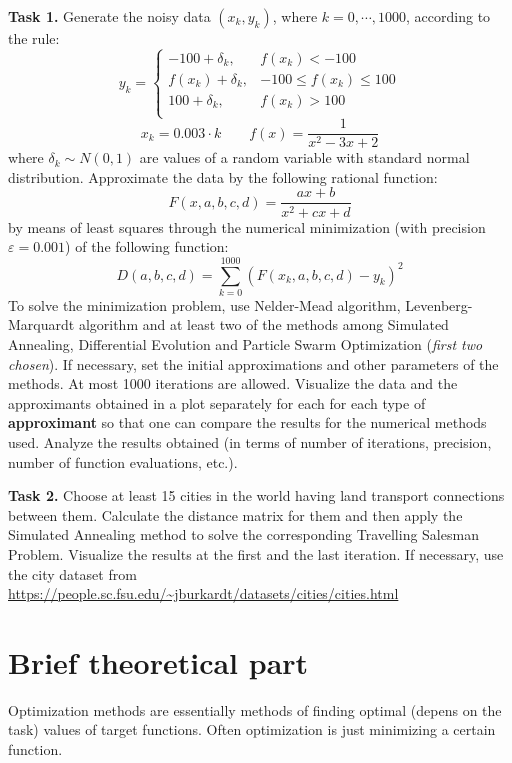 \documentclass[12pt, a4paper]{article}
\begin{document}
\textbf{Task 1.} Generate the noisy data $(x_k, y_k)$, where $k = 0, \cdots, 1000$, according to the rule:
\[ y_k = \begin{cases}
	-100 + \delta_k,   & f(x_k) < -100             \\
	f(x_k) + \delta_k, & -100 \leq f(x_k) \leq 100 \\
	100 + \delta_k,    & f(x_k) > 100              \\
\end{cases} \]
\[ x_k = 0.003 \cdot k \qquad f(x) = \frac{1}{x^2 - 3x + 2} \]
where $\delta_k \sim N(0, 1)$ are values of a random variable with standard normal distribution. Approximate the data by the following rational function:
\[ F(x, a, b, c, d) = \frac{ax + b}{x^2 + cx + d} \]
by means of least squares through the numerical minimization (with precision $\varepsilon = 0.001$) of the following function:
\[ D(a, b, c, d) = \sum_{k=0}^{1000} \left( F(x_k, a, b, c, d) - y_k \right)^2 \]
To solve the minimization problem, use Nelder-Mead algorithm, Levenberg-Marquardt algorithm and at least two of the methods among Simulated Annealing, Differential Evolution and Particle Swarm Optimization (\textit{first two chosen}). If necessary, set the initial approximations and other parameters of the methods. At most 1000 iterations are allowed. Visualize the data and the approximants obtained in a plot separately for each for each type of \textbf{approximant} so that one can compare the results for the numerical methods used. Analyze the results obtained (in terms of number of iterations, precision, number of function evaluations, etc.).

\textbf{Task 2.} Choose at least 15 cities in the world having land transport connections between them. Calculate the distance matrix for them and then apply the Simulated Annealing method to solve the corresponding Travelling Salesman Problem. Visualize the results at the first and the last iteration. If necessary, use the city dataset from \newline
\url{https://people.sc.fsu.edu/~jburkardt/datasets/cities/cities.html}

\newpage

\section*{Brief theoretical part}

Optimization methods are essentially methods of finding optimal (depens on the task) values of target functions. Often optimization is just minimizing a certain function.
\end{document}
